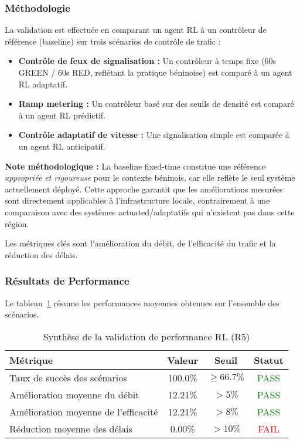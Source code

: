 \subsubsection{Méthodologie}
La validation est effectuée en comparant un agent RL à un contrôleur de référence (baseline) sur trois scénarios de contrôle de trafic :
\begin{itemize}
    \item \textbf{Contrôle de feux de signalisation :} Un contrôleur à temps fixe (60s GREEN / 60s RED, reflétant la pratique béninoise) est comparé à un agent RL adaptatif.
    \item \textbf{Ramp metering :} Un contrôleur basé sur des seuils de densité est comparé à un agent RL prédictif.
    \item \textbf{Contrôle adaptatif de vitesse :} Une signalisation simple est comparée à un agent RL anticipatif.
\end{itemize}

\textbf{Note méthodologique :} La baseline fixed-time constitue une référence \textit{appropriée et rigoureuse} pour le contexte béninois, car elle reflète le seul système actuellement déployé. Cette approche garantit que les améliorations mesurées sont directement applicables à l'infrastructure locale, contrairement à une comparaison avec des systèmes actuated/adaptatifs qui n'existent pas dans cette région.

Les métriques clés sont l'amélioration du débit, de l'efficacité du trafic et la réduction des délais.

\subsubsection{Résultats de Performance}

Le tableau~\ref{tab:rl_performance_summary_76} résume les performances moyennes obtenues sur l'ensemble des scénarios.

\begin{table}[h!]
\centering
\caption{Synthèse de la validation de performance RL (R5)}
\label{tab:rl_performance_summary_76}
\begin{tabular}{|l|c|c|c|}
\hline
\textbf{Métrique} & \textbf{Valeur} & \textbf{Seuil} & \textbf{Statut} \\
\hline
Taux de succès des scénarios & 100.0\% & $\geq 66.7\%$ & \textcolor{green}{PASS} \\
Amélioration moyenne du débit & 12.21\% & $> 5\%$ & \textcolor{green}{PASS} \\
Amélioration moyenne de l'efficacité & 12.21\% & $> 8\%$ & \textcolor{green}{PASS} \\
Réduction moyenne des délais & 0.00\% & $> 10\%$ & \textcolor{red}{FAIL} \\
\hline
\end{tabular}
\end{table}

